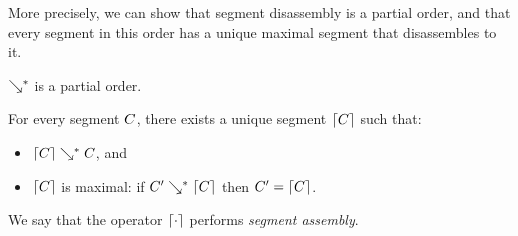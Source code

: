 More precisely, we can show that segment disassembly is a
partial order, and that every segment in this order
has a unique maximal segment that disassembles to it.
\begin{lemma}
  $\searrow^*$ is a partial order.
\end{lemma}
\begin{lemma}\label{lemma:unique-parsed-selection}
  For every segment $C$, there exists a unique
  segment $\left\lceil C\right\rceil$ such that:
  \begin{itemize}
  \item $\left\lceil C\right\rceil\searrow^*C$, and
  \item $\left\lceil C\right\rceil$ is maximal: if $C'\searrow^*\left\lceil C\right\rceil$ then $C' = \left\lceil C\right\rceil$.
  \end{itemize}
\end{lemma}
\noindent
We say that the operator $\left\lceil\cdot\right\rceil$ performs \emph{segment assembly}.


% 

